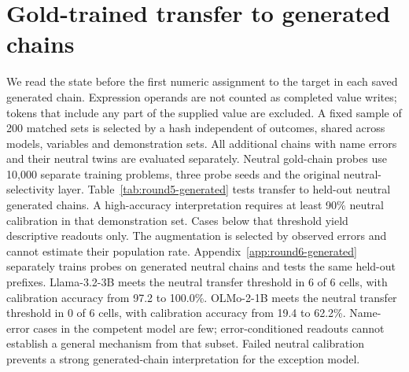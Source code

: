 \section{Gold-trained transfer to generated chains}
\label{app:round5-generated}
We read the state before the first numeric assignment to the target in each saved generated chain. Expression operands are not counted as completed value writes; tokens that include any part of the supplied value are excluded. A fixed sample of 200 matched sets is selected by a hash independent of outcomes, shared across models, variables and demonstration sets. All additional chains with name errors and their neutral twins are evaluated separately.
Neutral gold-chain probes use 10,000 separate training problems, three probe seeds and the original neutral-selectivity layer. Table~\ref{tab:round5-generated} tests transfer to held-out neutral generated chains. A high-accuracy interpretation requires at least 90\% neutral calibration in that demonstration set. Cases below that threshold yield descriptive readouts only. The augmentation is selected by observed errors and cannot estimate their population rate. Appendix~\ref{app:round6-generated} separately trains probes on generated neutral chains and tests the same held-out prefixes.
Llama-3.2-3B meets the neutral transfer threshold in 6 of 6 cells, with calibration accuracy from 97.2 to 100.0\%.
OLMo-2-1B meets the neutral transfer threshold in 0 of 6 cells, with calibration accuracy from 19.4 to 62.2\%.
Name-error cases in the competent model are few; error-conditioned readouts cannot establish a general mechanism from that subset. Failed neutral calibration prevents a strong generated-chain interpretation for the exception model.
